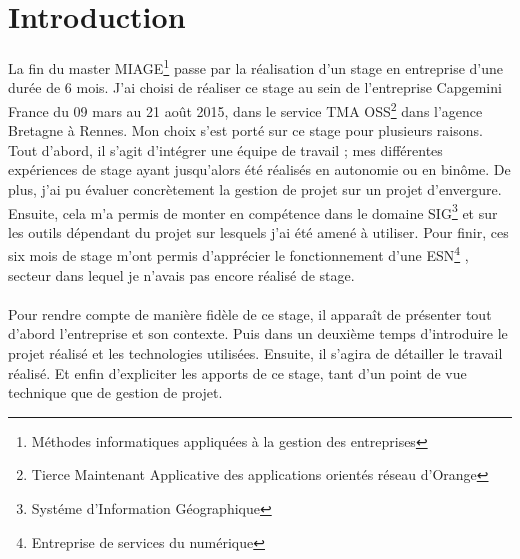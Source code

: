 \chapter*{Introduction}

La fin du master MIAGE\footnote{Méthodes informatiques appliquées à la gestion des entreprises}
passe par la réalisation d’un stage en entreprise d’une durée de 6 mois.
J’ai choisi de réaliser ce stage au sein de l’entreprise Capgemini France du 09 mars au 21 août 2015,
dans le service TMA OSS\footnote{Tierce Maintenant Applicative des applications orientés réseau d'Orange} dans l’agence Bretagne à Rennes.
Mon choix s’est porté sur ce stage pour plusieurs raisons. Tout d’abord, il s’agit d’intégrer
une équipe de travail ; mes différentes expériences de stage ayant jusqu’alors été réalisés en
autonomie ou en binôme. De plus, j’ai pu évaluer concrètement la gestion de projet sur un
projet d’envergure. Ensuite, cela m’a permis de monter en compétence dans le domaine SIG\footnote{Systéme d'Information Géographique} et
sur les outils dépendant du projet sur lesquels j'ai été amené à utiliser.
 Pour finir, ces six mois de stage m’ont permis d’apprécier le
fonctionnement d’une ESN\footnote{Entreprise de services du numérique}
, secteur dans lequel je n’avais pas encore réalisé de stage.
\\\\

Pour rendre compte de manière fidèle de ce stage, il apparaît de présenter tout d’abord
l’entreprise et son contexte. Puis dans un deuxième temps d’introduire le projet réalisé et les
technologies utilisées. Ensuite, il s’agira de détailler le travail réalisé. Et enfin d’expliciter les
apports de ce stage, tant d’un point de vue technique que de gestion de projet.

